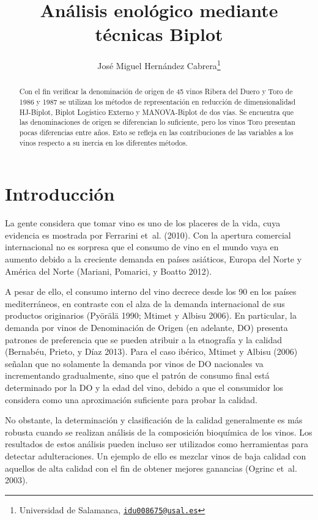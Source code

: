 \documentclass[
  10pt,
  spanish,
]{article}
\title{Análisis enológico mediante técnicas Biplot}
\author{José Miguel Hernández Cabrera\footnote{Universidad de Salamanca,
  \href{mailto:idu008675@usal.es}{\nolinkurl{idu008675@usal.es}}}}
\date{}
\begin{document}
\maketitle
\begin{abstract}
Con el fin verificar la denominación de origen de 45 vinos Ribera del
Duero y Toro de 1986 y 1987 se utilizan los métodos de representación en
reducción de dimensionalidad HJ-Biplot, Biplot Logístico Externo y
MANOVA-Biplot de dos vías. Se encuentra que las denominaciones de origen
se diferencian lo suficiente, pero los vinos Toro presentan pocas
diferencias entre años. Esto se refleja en las contribuciones de las
variables a los vinos respecto a su inercia en los diferentes métodos.
\end{abstract}

\bigskip

\bigskip

\hypertarget{introducciuxf3n}{%
\section{Introducción}\label{introducciuxf3n}}

La gente considera que tomar vino es uno de los placeres de la vida,
cuya evidencia es mostrada por Ferrarini et~al. (2010). Con la apertura
comercial internacional no es sorpresa que el consumo de vino en el
mundo vaya en aumento debido a la creciente demanda en países asiáticos,
Europa del Norte y América del Norte (Mariani, Pomarici, y Boatto 2012).

A pesar de ello, el consumo interno del vino decrece desde los 90 en los
países mediterráneos, en contraste con el alza de la demanda
internacional de sus productos originarios (Pyörälä 1990; Mtimet y
Albisu 2006). En particular, la demanda por vinos de Denominación de
Origen (en adelante, DO) presenta patrones de preferencia que se pueden
atribuir a la etnografía y la calidad (Bernabéu, Prieto, y Díaz 2013).
Para el caso ibérico, Mtimet y Albisu (2006) señalan que no solamente la
demanda por vinos de DO nacionales va incrementando gradualmente, sino
que el patrón de consumo final está determinado por la DO y la edad del
vino, debido a que el consumidor los considera como una aproximación
suficiente para probar la calidad.

No obstante, la determinación y clasificación de la calidad generalmente
es más robusta cuando se realizan análisis de la composición bioquímica
de los vinos. Los resultados de estos análisis pueden incluso ser
utilizados como herramientas para detectar adulteraciones. Un ejemplo de
ello es mezclar vinos de baja calidad con aquellos de alta calidad con
el fin de obtener mejores ganancias (Ogrinc et~al. 2003).
\end{document}

